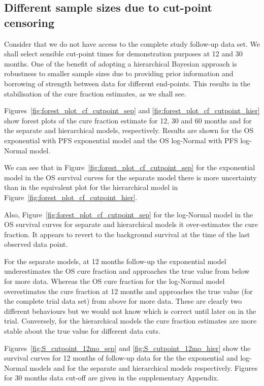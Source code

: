 \documentclass[AMA,STIX1COL]{WileyNJD-v2}
\begin{document}
%
\subsection{Different sample sizes due to cut-point censoring}
Consider that we do not have access to the complete study follow-up data set.
We shall select sensible cut-point times for demonstration purposes at 12 and 30 months.
One of the benefit of adopting a hierarchical Bayesian approach is robustness to smaller sample sizes due to providing prior information and borrowing of strength between data for different end-points.
This results in the stabilisation of the cure fraction estimates, as we shall see.

Figures~\ref{fig:forest_plot_cf_cutpoint_sep} and \ref{fig:forest_plot_cf_cutpoint_hier} show forest plots of the cure fraction estimate for 12, 30 and 60 months and for the separate and hierarchical models, respectively.
Results are shown for the OS exponential with PFS exponential model and the OS log-Normal with PFS log-Normal model.


We can see that in Figure~\ref{fig:forest_plot_cf_cutpoint_sep} for the exponential model in the OS survival curves for the separate model there is more uncertainty than in the equivalent plot for the hierarchical model in Figure~\ref{fig:forest_plot_cf_cutpoint_hier}.

Also, Figure~\ref{fig:forest_plot_cf_cutpoint_sep} for the log-Normal model in the OS survival curves for separate and hierarchical models it over-estimates the cure fraction. It appears to revert to the background survival at the time of the last observed data point.


For the separate models, at 12 months follow-up the exponential model underestimates the OS cure fraction and approaches the true value from below for more data.
Whereas the OS cure fraction for the log-Normal model overestimates the cure fraction at 12 months and approaches the true value (for the complete trial data set) from above for more data.
These are clearly two different behaviours but we would not know which is correct until later on in the trial.
Conversely, for the hierarchical models the cure fraction estimates are more stable about the true value for different data cuts.


Figures~\ref{fig:S_cutpoint_12mo_sep} and \ref{fig:S_cutpoint_12mo_hier} show
the survival curves for 12 months of follow-up data for the the exponential and log-Normal models and for the separate and hierarchical models respectively.
Figures for 30 months data cut-off are given in the supplementary Appendix.
\end{document}
